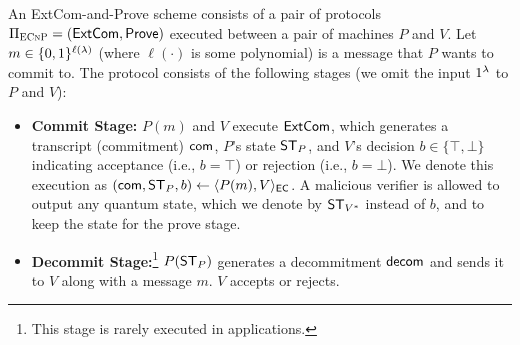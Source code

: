 \begin{definition}
\label{def:com-n-prove}
An ExtCom-and-Prove scheme consists of a pair of protocols $\mathrm{\Pi}_{\textsc{ECnP}} = (\mathsf{ExtCom}, \mathsf{Prove})$ executed between a pair of \PPT machines $P$ and $V$. Let $m\in \{0,1\}^{\ell(\lambda)}$ (where $\ell(\cdot)$ is some polynomial) is a message that $P$ wants to commit to. The protocol consists of the following stages (we omit the input $1^\lambda$ to $P$ and $V$): 
\begin{itemize}
\item 
{\bf Commit Stage:} 
$P(m)$ and $V$ execute $\mathsf{ExtCom}$, which generates a transcript (commitment) $\mathsf{com}$, 
$P$'s state $\mathsf{ST}_P$, and  
$V$'s decision $b\in \{\top,\bot\}$ indicating acceptance (i.e., $b=\top$) or rejection (i.e., $b=\bot$). We denote this execution as $(\mathsf{com}, \mathsf{ST}_P, b) \gets \langle P(m),V \rangle_\mathsf{EC}$. 
A malicious verifier is allowed to output any quantum state, which we denote by $\mathsf{ST}_{V^*}$ instead of $b$, and to keep the state for the prove stage. 

\item 
{\bf Decommit Stage:}\footnote{This stage is rarely executed in applications.} $P(\mathsf{ST}_P)$ generates a decommitment $\mathsf{decom}$ and sends it to $V$ along with a message $m$. $V$ accepts or rejects. %


\end{itemize}
\end{definition}
